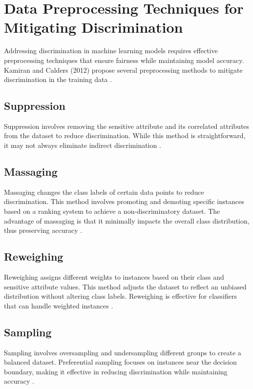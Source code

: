 \documentclass[12pt,a4paper]{report}
\begin{document}
\section{Data Preprocessing Techniques for Mitigating Discrimination}
Addressing discrimination in machine learning models requires effective preprocessing techniques that ensure fairness while maintaining model accuracy. Kamiran and Calders (2012) propose several preprocessing methods to mitigate discrimination in the training data \citep{kamiran2012data}.\\

\subsection{Suppression}
Suppression involves removing the sensitive attribute and its correlated attributes from the dataset to reduce discrimination. While this method is straightforward, it may not always eliminate indirect discrimination \citep{kamiran2012data}.\\

\subsection{Massaging}
Massaging changes the class labels of certain data points to reduce discrimination. This method involves promoting and demoting specific instances based on a ranking system to achieve a non-discriminatory dataset. The advantage of massaging is that it minimally impacts the overall class distribution, thus preserving accuracy \citep{kamiran2012data}.\\

\subsection{Reweighing}
Reweighing assigns different weights to instances based on their class and sensitive attribute values. This method adjusts the dataset to reflect an unbiased distribution without altering class labels. Reweighing is effective for classifiers that can handle weighted instances \citep{kamiran2012data}.\\

\subsection{Sampling}
Sampling involves oversampling and undersampling different groups to create a balanced dataset. Preferential sampling focuses on instances near the decision boundary, making it effective in reducing discrimination while maintaining accuracy \citep{kamiran2012data}.\\
\end{document}
